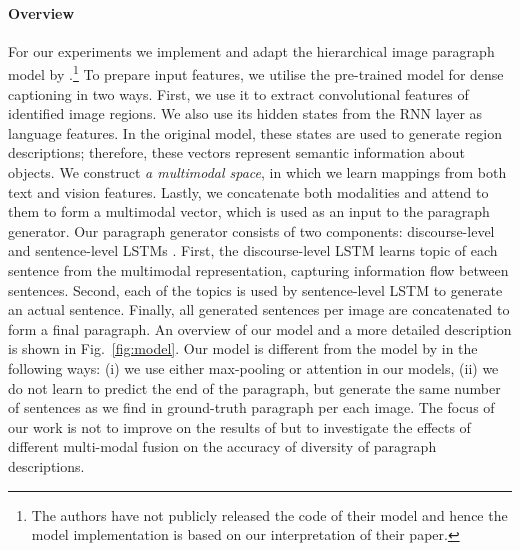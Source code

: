 \documentclass[11pt,a4paper]{article}
\begin{document}
\paragraph{Overview}
For our experiments we implement and adapt the hierarchical image paragraph model by \citet{krause2016hierarchical}.\footnote{The authors have not publicly released the code of their model and hence the model implementation is based on our interpretation of their paper.}
To prepare input features, we utilise the pre-trained model for dense captioning \cite{densecap} in two ways.
First, we use it to extract convolutional features of identified image regions.
We also use its hidden states from the RNN layer as language features.
In the original model, these states are used to generate region descriptions; therefore, these vectors represent semantic information about objects.
We construct \textit{a multimodal space}, in which we learn mappings from both text and vision features.
Lastly, we concatenate both modalities and attend to them to form a multimodal vector, which is used as an input to the paragraph generator.
Our paragraph generator consists of two components: discourse-level and sentence-level LSTMs \cite{lstm97}.
First, the discourse-level LSTM learns topic of each sentence from the multimodal representation, capturing information flow between sentences.
Second, each of the topics is used by sentence-level LSTM to generate an actual sentence.
Finally, all generated sentences per image are concatenated to form a final paragraph.
An overview of our model and a more detailed description is shown in Fig.~\ref{fig:model}.
Our model is different from the model by  in the following ways: (i) we use either max-pooling or attention in our models, (ii) we do not learn to predict the end of the paragraph, but generate the same number of sentences as we find in ground-truth paragraph per each image.
The focus of our work is not to improve on the results of  but to investigate the effects of different multi-modal fusion on the accuracy of diversity of paragraph descriptions. %
\end{document}
